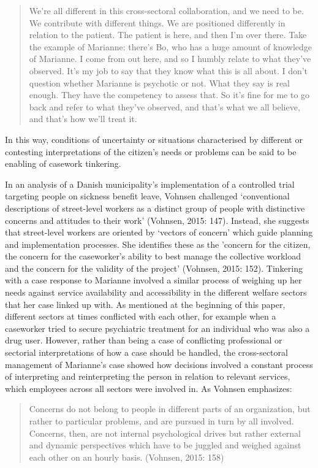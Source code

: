     \blockquote{We’re all different in this cross-sectoral collaboration, and we need to be. We contribute with different things. We are positioned differently in relation to the patient. The patient is here, and then I’m over there. Take the example of Marianne: there’s Bo, who has a huge amount of knowledge of Marianne. I come from out here, and so I humbly relate to what they’ve observed. It’s my job to say that they know what this is all about. I don’t question whether Marianne is psychotic or not. What they say is real enough. They have the competency to assess that. So it’s fine for me to go back and refer to what they’ve observed, and that’s what we all believe, and that’s how we’ll treat it.}
In this way, conditions of uncertainty or situations characterised by different or contesting interpretations of the citizen’s needs or problems can be said to be enabling of casework tinkering.
\par
In an analysis of a Danish municipality’s implementation of a controlled trial targeting people on sickness benefit leave, Vohnsen challenged ‘conventional descriptions of street-level workers as a distinct group of people with distinctive concerns and attitudes to their work’ (Vohnsen, 2015: 147). Instead, she suggests that street-level workers are oriented by ‘vectors of concern’ which guide planning and implementation processes. She identifies these as the 'concern for the citizen, the concern for the caseworker’s ability to best manage the collective workload and the concern for the validity of the project' (Vohnsen, 2015: 152). Tinkering with a case response to Marianne involved a similar process of weighing up her needs against service availability and accessibility in the different welfare sectors that her case linked up with. As mentioned at the beginning of this paper, different sectors at times conflicted with each other, for example when a caseworker tried to secure psychiatric treatment for an individual who was also a drug user. However, rather than being a case of conflicting professional or sectorial interpretations of how a case should be handled, the cross-sectoral management of Marianne’s case showed how decisions involved a constant process of interpreting and reinterpreting the person in relation to relevant services, which employees across all sectors were involved in. As Vohnsen emphasizes:
    \blockquote{Concerns do not belong to people in different parts of an organization, but rather to particular problems, and are pursued in turn by all involved. Concerns, then, are not internal psychological drives but rather external and dynamic perspectives which have to be juggled and weighed against each other on an hourly basis. (Vohnsen, 2015: 158)}
